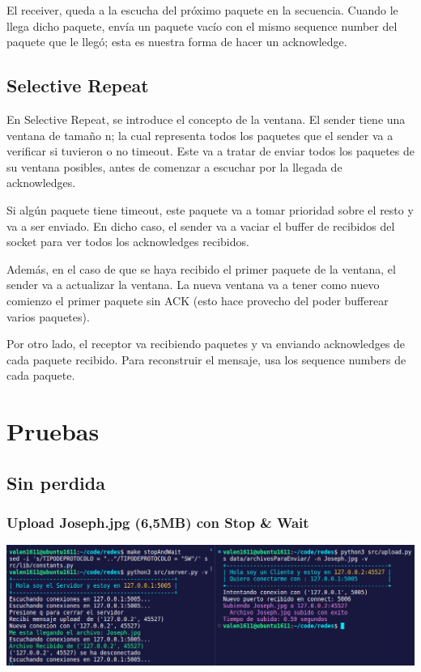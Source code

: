 \documentclass{article}
\begin{document}
El receiver, queda a la escucha del próximo paquete en la secuencia. Cuando le llega dicho paquete, envía un paquete vacío con el mismo sequence number del paquete que le llegó; esta es nuestra forma de hacer un acknowledge.

\subsection{Selective Repeat}\label{selective-repeat}

En Selective Repeat, se introduce el concepto de la ventana. El sender tiene una ventana de tamaño n; la cual representa todos los paquetes que el sender va a verificar si tuvieron o no timeout. Este va a tratar de enviar todos los paquetes de su ventana posibles, antes de comenzar a escuchar por la llegada de acknowledges.

Si algún paquete tiene timeout, este paquete va a tomar prioridad sobre el resto y va a ser enviado. En dicho caso, el sender va a vaciar el buffer de recibidos del socket para ver todos los acknowledges recibidos.

Además, en el caso de que se haya recibido el primer paquete de la ventana, el sender va a actualizar la ventana. La nueva ventana va a tener como nuevo comienzo el primer paquete sin ACK (esto hace provecho del poder bufferear varios paquetes).

Por otro lado, el receptor va recibiendo paquetes y va enviando acknowledges de cada paquete recibido. Para reconstruir el mensaje, usa los sequence numbers de cada paquete.

\section{\texorpdfstring{\textbf{Pruebas}}{Pruebas}}\label{pruebas-wip}

\subsection{Sin perdida}
\subsubsection{Upload Joseph.jpg (6,5MB) con Stop \& Wait}
\begin{center}
\includegraphics[scale=0.35]{UploadJoseph.jpg(6,5MB)conStopWait}
\end{center}
\end{document}
